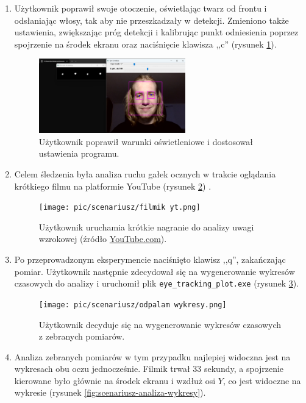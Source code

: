 \documentclass[a4paper,twoside,12pt]{book}
\begin{document}
\begin{enumerate}
	\item Użytkownik poprawił swoje otoczenie, oświetlając twarz od frontu i odsłaniając
	włosy, tak aby nie przeszkadzały w detekcji. Zmieniono także ustawienia, zwiększając
	próg detekcji i kalibrując punkt odniesienia poprzez spojrzenie na środek ekranu
	oraz naciśnięcie klawisza ,,c'' (rysunek \ref{fig:scenariusz-poprawione-swiatlo}).
	
	\begin{figure}[H]
		\centering
		\includegraphics[width=0.6\textwidth]{pic/scenariusz/poprawienie śledzenia.png}
		\caption{Użytkownik poprawił warunki oświetleniowe i dostosował ustawienia programu.}
		\label{fig:scenariusz-poprawione-swiatlo}
	\end{figure}

	\item Celem śledzenia była analiza ruchu gałek ocznych w trakcie oglądania krótkiego
	filmu na platformie YouTube (rysunek \ref{fig:scenariusz-yt}) \cite{bib:youtube}.
	
	\begin{figure}[H]
		\centering
		\texttt{[image: pic/scenariusz/filmik yt.png]}
		\caption{Użytkownik uruchamia krótkie nagranie do analizy uwagi wzrokowej (źródło \url{YouTube.com}).}
		\label{fig:scenariusz-yt}
	\end{figure}

	\item Po przeprowadzonym eksperymencie naciśnięto klawisz ,,q'', zakańczając pomiar.
	Użytkownik następnie zdecydował się na wygenerowanie wykresów czasowych do
	analizy i uruchomił plik \texttt{eye\_\-tracking\_\-plot.exe} (rysunek \ref{fig:scenariusz-odpalanie-wykresy}).
	
	\begin{figure}[H]
		\centering
		\texttt{[image: pic/scenariusz/odpalam wykresy.png]}
		\caption{Użytkownik decyduje się na wygenerowanie wykresów czasowych z zebranych pomiarów.}
		\label{fig:scenariusz-odpalanie-wykresy}
	\end{figure}

	\item Analiza zebranych pomiarów w tym przypadku najlepiej widoczna jest na wykresach
	obu oczu jednocześnie. Filmik trwał $33$ sekundy, a spojrzenie kierowane było głównie
	na środek ekranu i wzdłuż osi $Y$, co jest widoczne na wykresie (rysunek \ref{fig:scenariusz-analiza-wykresy}).
	

\end{enumerate}
\end{document}

